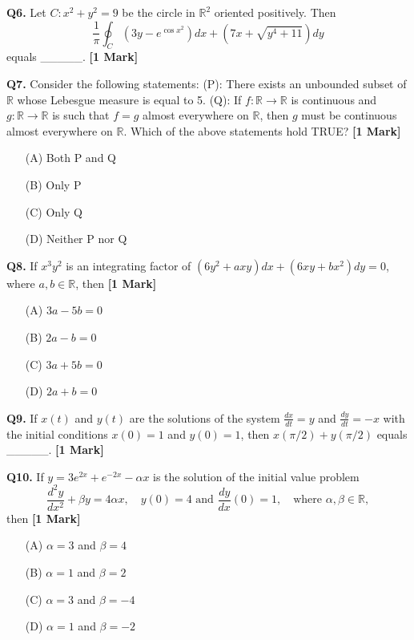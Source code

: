 \documentclass[11pt]{article}
\newcommand{\questiona}[2]{
    \noindent\textbf{Q#2.} #1 \hfill \textbf{[1 Mark]}
}
\begin{document}
\questiona{Let \( C: x^2 + y^2 = 9 \) be the circle in \(\mathbb{R}^2\) oriented positively. Then \[\frac{1}{\pi} \oint_C \left( 3y - e^{\cos x^2} \right) dx + \left( 7x + \sqrt{y^4 + 11} \right) dy\] equals \_\_\_\_\_.}{6}
\vspace{0.5cm}

\questiona{Consider the following statements:  
(P): There exists an unbounded subset of \(\mathbb{R}\) whose Lebesgue measure is equal to 5.  
(Q): If \( f : \mathbb{R} \to \mathbb{R} \) is continuous and \( g : \mathbb{R} \to \mathbb{R} \) is such that \( f = g \) almost everywhere on \(\mathbb{R}\), then \( g \) must be continuous almost everywhere on \(\mathbb{R}\).  
Which of the above statements hold TRUE?}{7}
\begin{enumerate}
    \item[(A)] Both P and Q  
    \item[(B)] Only P  
    \item[(C)] Only Q  
    \item[(D)] Neither P nor Q  
\end{enumerate}
\vspace{0.5cm}

\questiona{If \( x^3 y^2 \) is an integrating factor of \( \left( 6y^2 + axy \right) dx + \left( 6xy + bx^2 \right) dy = 0 \), where \( a, b \in \mathbb{R} \), then}{8}
\begin{enumerate}
    \item[(A)] \( 3a - 5b = 0 \)  
    \item[(B)] \( 2a - b = 0 \)  
    \item[(C)] \( 3a + 5b = 0 \)  
    \item[(D)] \( 2a + b = 0 \)  
\end{enumerate}
\vspace{0.5cm}

\questiona{If \( x(t) \) and \( y(t) \) are the solutions of the system \(\frac{dx}{dt} = y\) and \(\frac{dy}{dt} = -x\) with the initial conditions \( x(0) = 1 \) and \( y(0) = 1 \), then \( x(\pi / 2) + y(\pi / 2) \) equals \_\_\_\_\_.}{9}
\vspace{0.5cm}

\questiona{If \( y = 3e^{2x} + e^{-2x} - \alpha x \) is the solution of the initial value problem \[\frac{d^2 y}{dx^2} + \beta y = 4 \alpha x, \quad y(0) = 4 \text{ and } \frac{dy}{dx}(0) = 1, \quad \text{where } \alpha, \beta \in \mathbb{R}, \] then}{10}
\begin{enumerate}
    \item[(A)] \( \alpha = 3 \) and \( \beta = 4 \)  
    \item[(B)] \( \alpha = 1 \) and \( \beta = 2 \)  
    \item[(C)] \( \alpha = 3 \) and \( \beta = -4 \)  
    \item[(D)] \( \alpha = 1 \) and \( \beta = -2 \)  
\end{enumerate}
\vspace{0.5cm}
\end{document}
